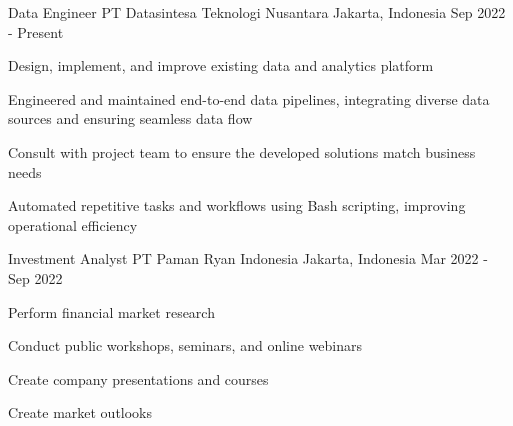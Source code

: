

\begin{cventries}

  \cventry
    {Data Engineer} %
    {PT Datasintesa Teknologi Nusantara} %
    {Jakarta, Indonesia} %
    {Sep 2022 - Present} %
    {
      \begin{cvitems} %
        \item {Design, implement, and improve existing data and analytics platform}
        \item {Engineered and maintained end-to-end data pipelines, integrating diverse data sources and ensuring seamless data flow}
        \item {Consult with project team to ensure the developed solutions match business needs}
        \item {Automated repetitive tasks and workflows using Bash scripting, improving operational efficiency}
      \end{cvitems}
    }

  \cventry
    {Investment Analyst} %
    {PT Paman Ryan Indonesia} %
    {Jakarta, Indonesia} %
    {Mar 2022 - Sep 2022} %
    {
      \begin{cvitems} %
        \item {Perform financial market research}
        \item {Conduct public workshops, seminars, and online webinars}
        \item {Create company presentations and courses}
        \item {Create market outlooks}
      \end{cvitems}
    }


\end{cventries}
